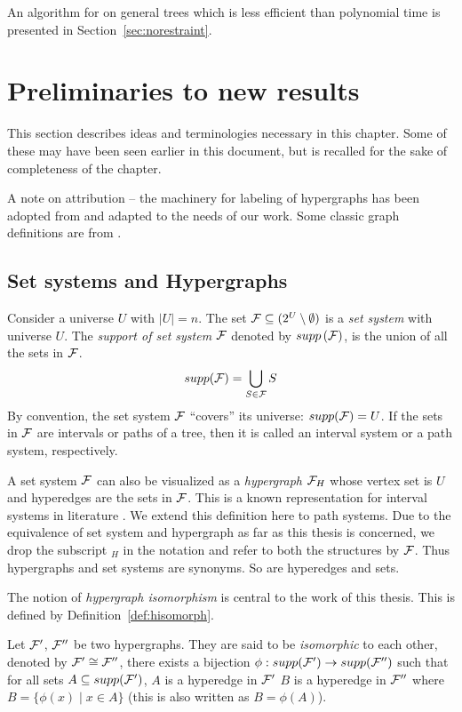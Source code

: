 
An algorithm for \CFTPL on general trees which is less efficient than
polynomial time is presented in
Section~\ref{sec:norestraint}. 

\section[Preliminaries]{Preliminaries to new results}
\label{ch:prelims}

This section describes ideas and terminologies necessary in this
chapter. Some of these may have been seen earlier in this document,
but is recalled for the sake of completeness of the chapter.  

A note on attribution -- the machinery for labeling of hypergraphs
has been adopted from \cite{kklv10} and adapted to the needs of our
work. Some classic graph definitions are from \cite{mcg04}.

\subsection{Set systems and Hypergraphs}
\label{sec:setsyshypergraph}

Consider a universe $U$ with $|U| = n$.  The set ${\mathcal F} \subseteq (2^{U}
\setminus \emptyset)$ is a {\em set system} with universe $U$.  The
{\em support of set system} ${\mathcal F}$ denoted by $supp\left({\cal F}\right)$, is the union
of all the sets in ${\mathcal F}$.
\[supp({\mathcal F}) = \bigcup_{S \in {\mathcal F}}S\]%
By convention, the set system ${\cal F}$ ``covers'' its universe:
$supp({\cal F}) = U$. If the sets in ${\cal F}$ are intervals or paths of a
tree, then it is called an interval system or a path system,
respectively.
\par
A set system ${\cal F}$ can also be visualized as a {\em hypergraph}
${\cal F}_H$ whose vertex set is $U$ and hyperedges are the sets in
${\cal F}$. This is a known representation for interval systems in
literature \cite{bls99,kklv10}.  We extend this definition here to
path systems. Due to the equivalence of set system and hypergraph as
far as this thesis is concerned, we drop the subscript $_H$ in the
notation and refer to both the structures by ${\cal F}$. Thus hypergraphs
and set systems are synonyms. So are hyperedges and sets.
\par
The notion of {\em hypergraph isomorphism} is central to the work of
this thesis. This is defined by Definition~\ref{def:hisomorph}.

\begin{definition}
  \label{def:hisomorph}
  Let ${\cal F}'$, ${\cal F}''$ be two hypergraphs.  They are said to be {\em
    isomorphic} to each other, denoted by ${\cal F}' \cong {\cal F}''$, \iff
  there exists a bijection $\phi: supp({\cal F}') \rightarrow supp({\cal F}'')$
  such that for all sets $A \subseteq supp({\cal F}')$, $A$ is a hyperedge
  in ${\cal F}'$ \iff $B$ is a hyperedge in ${\cal F}''$ where $B = \{\phi(x)
  \mid x \in A\}$ (this is also written as $B=\phi(A)$).
\end{definition}

